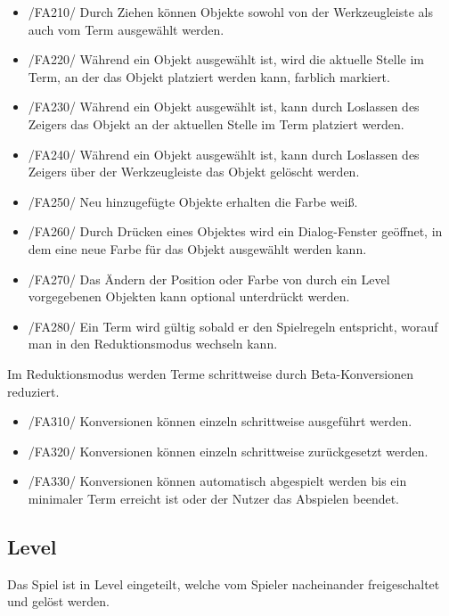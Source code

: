 \begin{itemize}
\item /FA210/ Durch Ziehen können Objekte sowohl von der Werkzeugleiste als auch vom Term ausgewählt werden.
\item /FA220/ Während ein Objekt ausgewählt ist, wird die aktuelle Stelle im Term, an der das Objekt platziert werden kann, farblich markiert.
\item /FA230/ Während ein Objekt ausgewählt ist, kann durch Loslassen des Zeigers das Objekt an der aktuellen Stelle im Term platziert werden.
\item /FA240/ Während ein Objekt ausgewählt ist, kann durch Loslassen des Zeigers über der Werkzeugleiste das Objekt gelöscht werden.
\item /FA250/ Neu hinzugefügte Objekte erhalten die Farbe weiß.
\item /FA260/ Durch Drücken eines Objektes wird ein Dialog-Fenster geöffnet, in dem eine neue Farbe für das Objekt ausgewählt werden kann.
\item /FA270/ Das Ändern der Position oder Farbe von durch ein Level vorgegebenen Objekten kann optional unterdrückt werden.
\item /FA280/ Ein Term wird gültig sobald er den Spielregeln entspricht, worauf man in den Reduktionsmodus wechseln kann.
\end{itemize}

Im Reduktionsmodus werden Terme schrittweise durch Beta-Konversionen reduziert.

\begin{itemize}
\item /FA310/ Konversionen können einzeln schrittweise ausgeführt werden.
\item /FA320/ Konversionen können einzeln schrittweise zurückgesetzt werden.
\item /FA330/ Konversionen können automatisch abgespielt werden bis ein minimaler Term erreicht ist oder der Nutzer das Abspielen beendet.
\end{itemize}

\subsection{Level}

Das Spiel ist in Level eingeteilt, welche vom Spieler nacheinander freigeschaltet und gelöst werden.

